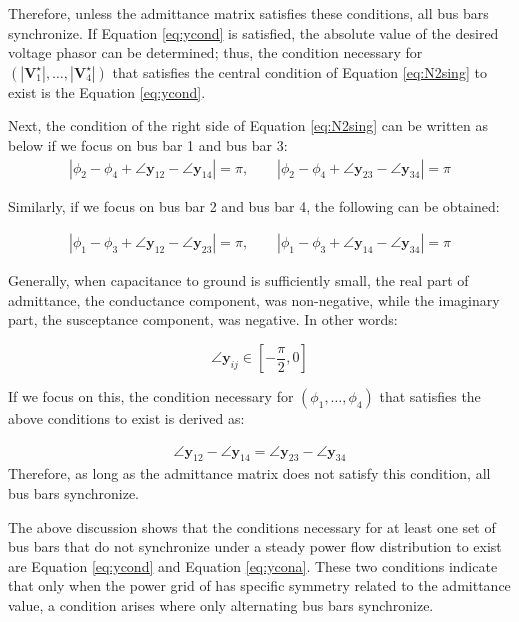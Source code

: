 \documentclass[tombow,dvipdfmx]{corona-a5-1.1}
\begin{document}
\begin{例}
Therefore, unless the admittance matrix satisfies these conditions, all bus bars synchronize.
If Equation \ref{eq:ycond} is satisfied, the absolute value of the desired voltage phasor can be determined; thus, the condition necessary for $(|\bm{V}_1^{\star}|,\ldots,|\bm{V}_4^{\star}|)$ that satisfies the central condition of Equation \ref{eq:N2sing} to exist is the Equation \ref{eq:ycond}.

Next, the condition of the right side of Equation \ref{eq:N2sing} can be written as below if we focus on bus bar 1 and bus bar 3:
\begin{align*}
|\phi_2 - \phi_4 + \angle \bm{y}_{12} - \angle \bm{y}_{14}|=\pi
,\qquad
|\phi_2 - \phi_4 + \angle \bm{y}_{23} - \angle \bm{y}_{34}|=\pi
\end{align*}

Similarly, if we focus on bus bar 2 and bus bar 4, the following can be obtained:

\begin{align*}
|\phi_1 - \phi_3 + \angle \bm{y}_{12} - \angle \bm{y}_{23}|=\pi
,\qquad
|\phi_1 - \phi_3 + \angle \bm{y}_{14} - \angle \bm{y}_{34}|=\pi
\end{align*}

Generally, when capacitance to ground is sufficiently small, the real part of admittance, the conductance component, was non-negative, while the imaginary part, the susceptance component, was negative.
In other words:

\[
\angle \bm{y}_{ij} \in \left[-\frac{\pi}{2},0 \right]
\]

If we focus on this, the condition necessary for $(\phi_1,\ldots,\phi_4)$ that satisfies the above conditions to exist is derived as:

\begin{align}\label{eq:ycona}
\angle \bm{y}_{12} - \angle \bm{y}_{14}=
\angle \bm{y}_{23} - \angle \bm{y}_{34}
\end{align}
Therefore, as long as the admittance matrix does not satisfy this condition, all bus bars synchronize.

The above discussion shows that the conditions necessary for at least one set of bus bars that do not synchronize under a steady power flow distribution to exist are Equation \ref{eq:ycond} and Equation \ref{eq:ycona}.
These two conditions indicate that only when the power grid of  has specific symmetry related to the admittance value, a condition arises where only alternating bus bars synchronize.
\end{例}
\end{document}
